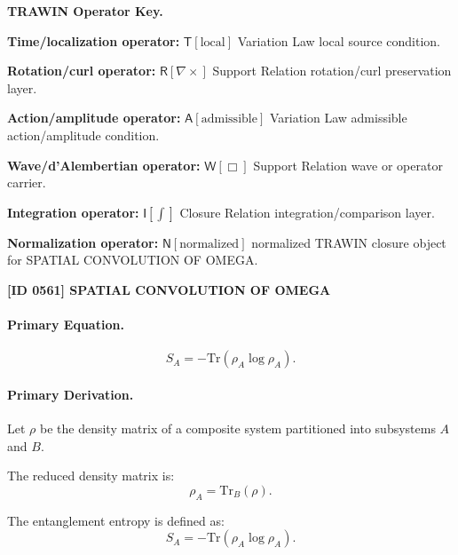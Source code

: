 \par\vspace{0.45\baselineskip}
\noindent\begin{minipage}[t]{\linewidth}
\begingroup
\small
\raggedright
\textbf{TRAWIN Operator Key.}\par
\noindent\textbf{Time/localization operator:} $\mathsf{T}\!\left[\mathrm{local}\right]$ Variation Law local source condition.\par
\noindent\textbf{Rotation/curl operator:} $\mathsf{R}\!\left[\nabla\times\right]$ Support Relation rotation/curl preservation layer.\par
\noindent\textbf{Action/amplitude operator:} $\mathsf{A}\!\left[\mathrm{admissible}\right]$ Variation Law admissible action/amplitude condition.\par
\noindent\textbf{Wave/d'Alembertian operator:} $\mathsf{W}\!\left[\Box\right]$ Support Relation wave or operator carrier.\par
\noindent\textbf{Integration operator:} $\mathsf{I}\!\left[\int\right]$ Closure Relation integration/comparison layer.\par
\noindent\textbf{Normalization operator:} $\mathsf{N}\!\left[\mathrm{normalized}\right]$ normalized TRAWIN closure object for SPATIAL CONVOLUTION OF OMEGA.\par
\endgroup
\end{minipage}

\clearpage
\noindent\textbf{[ID 0561] SPATIAL CONVOLUTION OF OMEGA}\par
\vspace{0.35em}
\paragraph{Primary Equation.}
\begin{equation}
S_A = -\mathrm{Tr}(\rho_A \log \rho_A).
\end{equation}

\paragraph{Primary Derivation.}
Let $\rho$ be the density matrix of a composite system partitioned into subsystems $A$ and $B$.

The reduced density matrix is:
\begin{equation}
\rho_A = \mathrm{Tr}_B(\rho).
\end{equation}

The entanglement entropy is defined as:
\begin{equation}
S_A = -\mathrm{Tr}(\rho_A \log \rho_A).
\end{equation}

